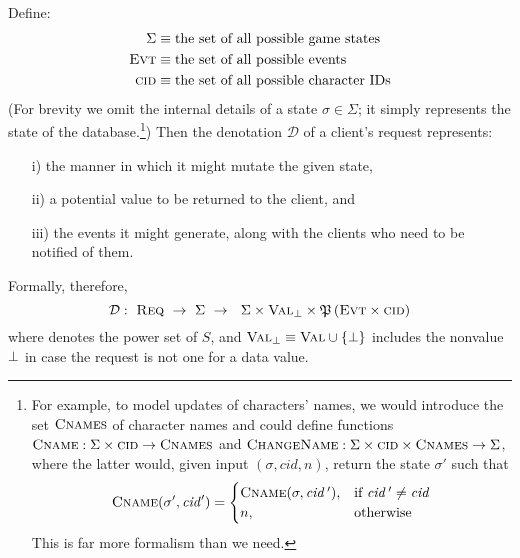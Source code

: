 Define:
\begin{align*}
  \Sigma    & \equiv \text{the set of all possible game states}\\
  \textsc{Evt} & \equiv \text{the set of all possible events} \\
  \textsc{cid} & \equiv \text{the set of all possible character IDs}
\end{align*}
(For brevity we omit the internal details of a state $\sigma \in
\Sigma$; it simply represents the state of the database.\footnote{For
  example, to model updates of characters' names, we would introduce
  the set $\textsc{Cnames}$ of character names and could define
  functions $\textsc{Cname}: \Sigma \times \textsc{cid} \rightarrow
  \textsc{Cnames}$ and $\textsc{ChangeName}: \Sigma \times \textsc{cid}
  \times \textsc{Cnames} \rightarrow \Sigma$, where the latter would,
  given input $(\sigma, \mathit{cid}, n)$, return the state $\sigma'$
  such that
  \[ \textsc{Cname}(\sigma', \mathit{cid}') =
  \begin{cases}
    \textsc{Cname}(\sigma, \mathit{cid}\,'), & \text{if}~\mathit{cid}\,' \neq
    \mathit{cid} \\
    n, & \text{otherwise}
  \end{cases}\]
  This is far more formalism than we need.})  Then the denotation
$\mathcal{D}$ of a client's request represents:
\begin{itemize}
\item[i)] the manner in which it might mutate the given state,
\item[ii)] a potential value to be returned to the client,
  and
\item[iii)] the events it might generate, along with the clients
  who need to be notified of them.
\end{itemize}
Formally, therefore,
\[ \mathcal{D}: ~\textsc{Req}~ \rightarrow ~\Sigma~
\rightarrow ~~\Sigma \times \textsc{Val}_{\bot} \times
\mathfrak P\left( \textsc{Evt}
  \times \textsc{cid} \right)
\]
where  denotes the power set of $S$, and $\textsc{Val}_{\bot}
\equiv \textsc{Val} \cup \{ \bot \}$ includes the nonvalue $\bot$ in
case the request is not one for a data value.

